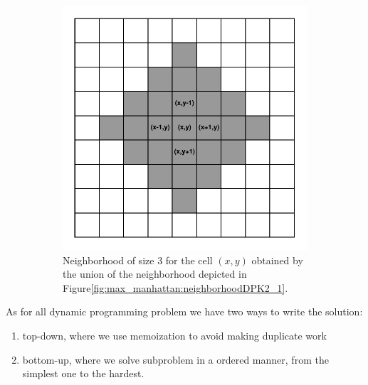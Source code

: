 \begin{figure}
	\hfill
	
	\begin{subfigure}[t]{0.4\textwidth}
		\centering
		\includegraphics[width=\textwidth]{sources/max_manhattan/images/neighborhoodDPK2_2}
		\caption[]{Neighborhood of size $3$ for the cell $(x,y)$ obtained by the union of the
		neighborhood depicted in Figure\ref{fig:max_manhattan:neighborhoodDPK2_1}.}
		\label{fig:max_manhattan:neighborhoodDPK2_2}
	 \end{subfigure}
	 \label{}
	 \caption{}
\end{figure}


As for all dynamic programming problem we have two ways to write the solution: \begin{enumerate}
	\item top-down, where we use memoization to avoid making duplicate work
	\item bottom-up, where we solve subproblem in a ordered manner, from the simplest one to the
	hardest.
\end{enumerate}

